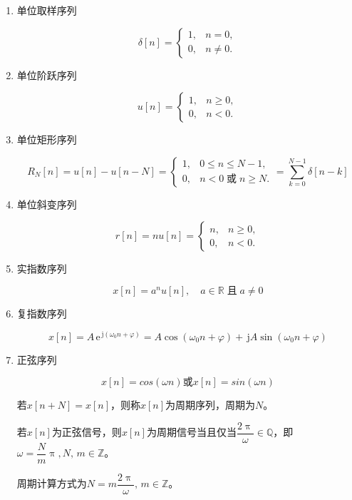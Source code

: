 \documentclass[UTF8,fontset=fandol,zihao=5]{ctexart}
\newcommand{\jj}{\,\mathrm{j}}
\newcommand{\ee}{\,\mathrm{e}}
\newcommand{\QQ}{\mathbb{Q}}
\newcommand{\ZZ}{\mathbb{Z}}
\begin{document}
\begin{enumerate}

  \item 单位取样序列
  
  \[
  \delta[n]=
    \begin{cases}
    1, & n=0,\\
    0, & n\neq 0.
    \end{cases}
  \]

  \item 单位阶跃序列
  
  \[
  u[n]=
    \begin{cases}
    1, & n\geq 0,\\
    0, & n<0.
    \end{cases}
  \]

  \item 单位矩形序列
  
  \[
  R_N[n]=u[n]-u[n-N]=
    \begin{cases}
    1, & 0 \leq n \leq N-1,\\
    0, & n<0\;\text{或}\;n\geq N.
    \end{cases}
  =\sum_{k=0}^{N-1} \delta[n-k]
  \]

  \item 单位斜变序列
  
  \[
  r[n]=nu[n]=
    \begin{cases}
    n, & n\geq 0,\\
    0, & n<0.
    \end{cases}
  \]

  \item 实指数序列
  
  \[
  x[n]=a^n u[n], \quad a \in \mathbb{R}\; \text{且} \; a \ne 0
  \]
  
  \item 复指数序列
  
  \[
  x[n]=A \ee^{\jj (\omega_0 n + \varphi)}=A\cos(\omega_0 n + \varphi) + \jj A\sin(\omega_0 n + \varphi)
  \]
  
  \item 正弦序列
  
  \[
  x[n] = cos(\omega n) \text{或} x[n] = sin (\omega n)
  \]

  \begin{methodbox}[离散时间信号序列的周期性]
    若$x[n+N]=x[n]$，则称$x[n]$为周期序列，周期为$N$。

    若$x[n]$为正弦信号，则$x[n]$为周期信号当且仅当$\dfrac{2\uppi}{\omega}\in \QQ$，即$\omega = \dfrac{N}{m}\uppi, N,\,m \in \ZZ $。

    周期计算方式为$N=m\dfrac{2\uppi}{\omega},\,m \in \ZZ$。
  \end{methodbox}

\end{enumerate}
\end{document}
